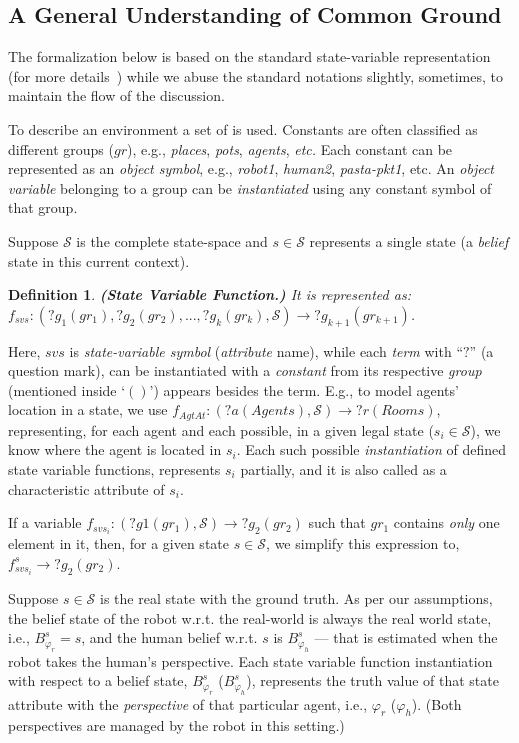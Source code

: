 \documentclass[letterpaper]{article} %
\newtheorem{definition}{Definition}
\begin{document}
\subsection{A General Understanding of Common Ground}
The formalization below is based on the standard state-variable representation (for more details~\cite{naubooks0014222}) while we abuse the standard notations slightly, sometimes, to maintain the flow of the discussion.

To describe an environment a set of  is used. 
Constants are often classified as different groups ($gr$), e.g., \textit{places}, \textit{pots}, \textit{agents}, \textit{etc.} 
Each constant can be represented as an \textit{object symbol}, e.g., \textit{robot1}, \textit{human2}, \textit{pasta-pkt1}, etc. 
An \textit{object variable} belonging to a group can be \textit{instantiated} using any constant symbol of that group.



Suppose $\mathcal{S}$ is the complete state-space and $s \in \mathcal{S}$ represents a single state (a \textit{belief} state in this current context).  

\begin{definition}\label{def:svf}
\textbf{(State Variable Function.)} It is represented as: $f_{svs}:(?g_1 (gr_1), ?g_2 (gr_2), ..., ?g_k (gr_k),\mathcal{S})\rightarrow ?g_{k+1} (gr_{k+1})$. 
\end{definition}
Here, $svs$ is \textit{state-variable symbol} (\textit{attribute} name), while each \textit{term} with ``$?$'' (a question mark), can be instantiated with a \textit{constant} from its respective \textit{group} (mentioned inside `$()$') appears besides the term. 
E.g., to model agents' location in a state, we use $f_{\textit{AgtAt}}:(?a (Agents), \mathcal{S}) \rightarrow ?r (Rooms)$, representing, for each agent and each possible, in a given legal state ($s_i \in \mathcal{S}$), we know where the agent is located in $s_i$. 
Each such possible \textit{instantiation} of defined state variable functions, represents $s_i$ partially, and it is also called as a characteristic attribute of $s_i$.     

If a variable $f_{svs_i}: (?g1 (gr_1), \mathcal{S}) \rightarrow ?g_2 (gr_2)$ such that $gr_1$ contains \textit{only} one element in it, then, for a given state $s \in \mathcal{S}$, we simplify this expression to, $f_{svs_i}^{s} \rightarrow ?g_2 (gr_2)$. 

Suppose $s \in \mathcal{S}$ is the real state with the ground truth. As per our assumptions, the belief state of the robot w.r.t. the real-world is always the real world state, i.e., $B_{\varphi_r}^s = s$, and the human belief w.r.t. $s$ is $B_{\varphi_h}^s$ --- that is estimated when the robot takes the human's perspective. Each state variable function instantiation with respect to a belief state, $B_{\varphi_r}^s$ ($B_{\varphi_h}^s$), represents the truth value of that state attribute with the \textit{perspective} of that particular agent, i.e., $\varphi_r$ ($\varphi_h$). (Both perspectives are managed by the robot in this setting.) 
\end{document}
